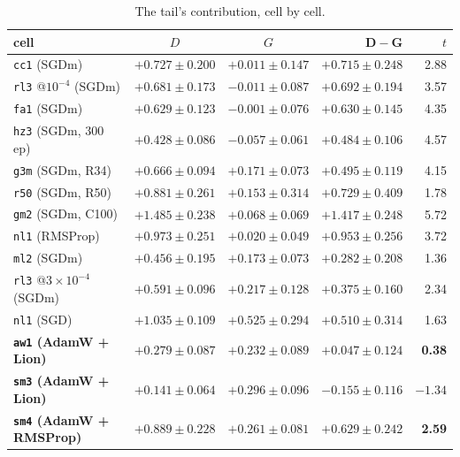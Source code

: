 \documentclass[10pt,letterpaper]{article}
\newcommand{\Dstat}{D}                         %
\newcommand{\Gstat}{G}                         %
\newcommand{\arm}[1]{\texttt{#1}}
\begin{document}
\begin{table}[htbp]
\centering
\small
\caption{The tail's contribution, cell by cell.}
\label{tab:DG}
\begin{tabular}{@{}lccrr@{}}
\toprule
cell & $\Dstat$ & $\Gstat$ & $\mathbf{\Dstat - \Gstat}$ & $t$ \\
\midrule
\arm{cc1} (SGDm) & $+0.727 \pm 0.200$ & $+0.011 \pm 0.147$ & $\mathbf{+0.715 \pm 0.248}$ & 2.88 \\
\arm{rl3} @$10^{-4}$ (SGDm) & $+0.681 \pm 0.173$ & $-0.011 \pm 0.087$ &
  $\mathbf{+0.692 \pm 0.194}$ & 3.57 \\
\arm{fa1} (SGDm) & $+0.629 \pm 0.123$ & $-0.001 \pm 0.076$ & $\mathbf{+0.630 \pm 0.145}$ & 4.35 \\
\arm{hz3} (SGDm, 300 ep) & $+0.428 \pm 0.086$ & $-0.057 \pm 0.061$ &
  $\mathbf{+0.484 \pm 0.106}$ & 4.57 \\
\arm{g3m} (SGDm, R34) & $+0.666 \pm 0.094$ & $+0.171 \pm 0.073$ & $\mathbf{+0.495 \pm 0.119}$ &
  4.15 \\
\arm{r50} (SGDm, R50) & $+0.881 \pm 0.261$ & $+0.153 \pm 0.314$ & $\mathbf{+0.729 \pm 0.409}$ &
  1.78 \\
\arm{gm2} (SGDm, C100) & $+1.485 \pm 0.238$ & $+0.068 \pm 0.069$ & $\mathbf{+1.417 \pm 0.248}$ &
  5.72 \\
\arm{nl1} (RMSProp) & $+0.973 \pm 0.251$ & $+0.020 \pm 0.049$ & $\mathbf{+0.953 \pm 0.256}$ &
  3.72 \\
\arm{ml2} (SGDm) & $+0.456 \pm 0.195$ & $+0.173 \pm 0.073$ & $\mathbf{+0.282 \pm 0.208}$ & 1.36 \\
\arm{rl3} @$3{\times}10^{-4}$ (SGDm) & $+0.591 \pm 0.096$ & $+0.217 \pm 0.128$ &
  $\mathbf{+0.375 \pm 0.160}$ & 2.34 \\
\arm{nl1} (SGD) & $+1.035 \pm 0.109$ & $+0.525 \pm 0.294$ & $\mathbf{+0.510 \pm 0.314}$ & 1.63 \\
\textbf{\arm{aw1} (AdamW + Lion)} & $+0.279 \pm 0.087$ & $\mathbf{+0.232 \pm 0.089}$ &
  $\mathbf{+0.047 \pm 0.124}$ & \textbf{0.38} \\
\textbf{\arm{sm3} (AdamW + Lion)} & $+0.141 \pm 0.064$ & $\mathbf{+0.296 \pm 0.096}$ &
  $\mathbf{-0.155 \pm 0.116}$ & $\mathbf{-1.34}$ \\
\textbf{\arm{sm4} (AdamW + RMSProp)} & $+0.889 \pm 0.228$ & $\mathbf{+0.261 \pm 0.081}$ &
  $\mathbf{+0.629 \pm 0.242}$ & \textbf{2.59} \\
\bottomrule
\end{tabular}
\end{table}
\end{document}
